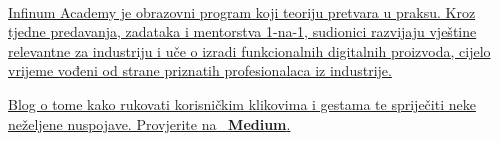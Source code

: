\documentclass[theme]{cv_style}
\begin{document}
\begin{paracol}{2}
\begin{leftcolumn*}
{{\begin{minipage}[l]{0.9\leftcolwidth}
                    \vspace{\itemspace}\\
                \end{minipage}
            }%
        } %
        \end{leftcolumn*}
        \begin{rightcolumn}\noindent \small
            \hspace{-2.4pt}
            \href{https://infinum.academy/}{
            {Infinum Academy je obrazovni program koji teoriju pretvara u praksu. Kroz tjedne predavanja, zadataka i mentorstva 1-na-1, sudionici razvijaju vještine relevantne za industriju i uče o izradi funkcionalnih digitalnih proizvoda, cijelo vrijeme vođeni od strane priznatih profesionalaca iz industrije.}}

            \vspace{\sectionspace}
            \href{https://medium.com/azikus/android-how-to-handle-taps-247140d196e9}{
            {Blog o tome kako rukovati korisničkim klikovima i gestama te spriječiti neke neželjene nuspojave. Provjerite na \faMedium \ \textbf{Medium}.}}
        \end{rightcolumn}
        \vspace{20em}
    \end{paracol}
\end{document}
